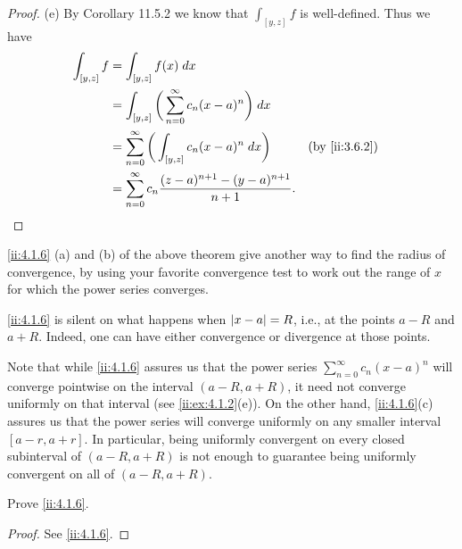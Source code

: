 \begin{proof}{(e)}
  By Corollary 11.5.2 we know that \(\int_{[y, z]} f\) is well-defined.
  Thus we have
  \begin{align*}
    \int_{[y, z]} f & = \int_{[y, z]} f(x) \; dx                                                                  \\
                    & = \int_{[y, z]} \bigg(\sum_{n = 0}^\infty c_n (x - a)^n\bigg) \; dx                         \\
                    & = \sum_{n = 0}^\infty \bigg(\int_{[y, z]} c_n (x - a)^n \; dx\bigg)         &  & \by{ii:3.6.2} \\
                    & = \sum_{n = 0}^\infty c_n \dfrac{(z - a)^{n + 1} - (y - a)^{n + 1}}{n + 1}.
  \end{align*}
\end{proof}

\begin{note}
  \cref{ii:4.1.6} (a) and (b) of the above theorem give another way to find the radius of convergence, by using your favorite convergence test to work out the range of \(x\) for which the power series converges.
\end{note}

\setcounter{thm}{7}
\begin{rmk}\label{ii:4.1.8}
  \cref{ii:4.1.6} is silent on what happens when \(\left\lvert x - a\right\rvert = R\), i.e., at the points \(a - R\) and \(a + R\).
  Indeed, one can have either convergence or divergence at those points.
\end{rmk}

\begin{rmk}\label{ii:4.1.9}
  Note that while \cref{ii:4.1.6} assures us that the power series \(\sum_{n = 0}^\infty c_n (x - a)^n\) will converge pointwise on the interval \((a - R, a + R)\), it need not converge uniformly on that interval
  (see \cref{ii:ex:4.1.2}(e)).
  On the other hand, \cref{ii:4.1.6}(c) assures us that the power series will converge uniformly on any smaller interval \([a - r, a + r]\).
  In particular, being uniformly convergent on every closed subinterval of \((a - R, a + R)\) is not enough to guarantee being uniformly convergent on all of \((a - R, a + R)\).
\end{rmk}

\exercisesection

\begin{ex}\label{ii:ex:4.1.1}
  Prove \cref{ii:4.1.6}.
\end{ex}

\begin{proof}
  See \cref{ii:4.1.6}.
\end{proof}

